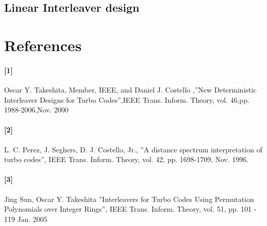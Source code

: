 \documentclass[20 pts]{article}
\begin{document}
\subsection{Linear Interleaver design}




\newpage
\section{References}
\paragraph{[1]}  Oscar Y. Takeshita, Member, IEEE, and Daniel J. Costello ,''New Deterministic Interleaver Designs for Turbo Codes'',IEEE Trans. Inform. Theory, vol.  46,pp. 1988-2006,Nov. 2000\\
\paragraph{[2]}  L. C. Perez, J. Seghers, D. J. Costello, Jr., ''A distance spectrum interpretation of turbo codes'', IEEE Trans. Inform. Theory, vol. 42, pp. 1698-1709, Nov. 1996.\\
\paragraph{[3]} Jing Sun, Oscar Y. Takeshita ”Interleavers for Turbo Codes Using Permutation Polynomials over Integer Rings”, IEEE Trans. Inform. Theory, vol. 51,
pp. 101 - 119 Jan. 2005
\end{document}

